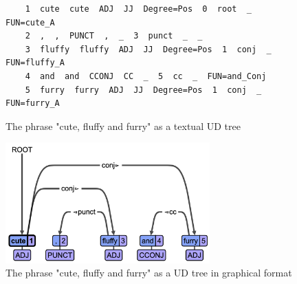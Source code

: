 \documentclass{article}
\begin{document}
\begin{figure}
    \begin{verbatim}
    1  cute  cute  ADJ  JJ  Degree=Pos  0  root  _  FUN=cute_A
    2  ,  ,  PUNCT  ,  _  3  punct  _  _
    3  fluffy  fluffy  ADJ  JJ  Degree=Pos  1  conj  _  FUN=fluffy_A
    4  and  and  CCONJ  CC  _  5  cc  _  FUN=and_Conj
    5  furry  furry  ADJ  JJ  Degree=Pos  1  conj  _  FUN=furry_A
    \end{verbatim}
    \caption{The phrase "cute, fluffy and furry" as a textual UD tree}
    \label{fig:ud_cute_text}
\end{figure}

\begin{figure}
    \centering
    \includegraphics[width=0.7\textwidth]{ud_cute.png}
    \caption{The phrase "cute, fluffy and furry" as a UD tree in graphical format}
    \label{fig:ud_cute}
\end{figure}
% 
\end{document}
